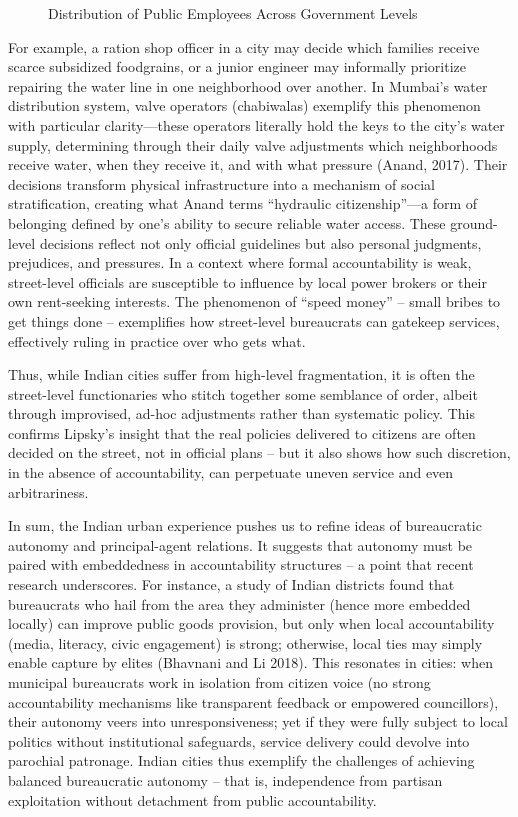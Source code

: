 \begin{figure}[htbp]
\centering
\caption{Distribution of Public Employees Across Government Levels}
\label{fig:employees_distribution}
\end{figure}

For example, a ration shop officer in a city may decide which families receive scarce subsidized foodgrains, or a junior engineer may informally prioritize repairing the water line in one neighborhood over another. In Mumbai's water distribution system, valve operators (chabiwalas) exemplify this phenomenon with particular clarity—these operators literally hold the keys to the city's water supply, determining through their daily valve adjustments which neighborhoods receive water, when they receive it, and with what pressure (Anand, 2017). Their decisions transform physical infrastructure into a mechanism of social stratification, creating what Anand terms ``hydraulic citizenship''—a form of belonging defined by one's ability to secure reliable water access. These ground-level decisions reflect not only official guidelines but also personal judgments, prejudices, and pressures. In a context where formal accountability is weak, street-level officials are susceptible to influence by local power brokers or their own rent-seeking interests. The phenomenon of ``speed money'' – small bribes to get things done – exemplifies how street-level bureaucrats can gatekeep services, effectively ruling in practice over who gets what.

Thus, while Indian cities suffer from high-level fragmentation, it is often the street-level functionaries who stitch together some semblance of order, albeit through improvised, ad-hoc adjustments rather than systematic policy. This confirms Lipsky's insight that the real policies delivered to citizens are often decided on the street, not in official plans – but it also shows how such discretion, in the absence of accountability, can perpetuate uneven service and even arbitrariness.

In sum, the Indian urban experience pushes us to refine ideas of bureaucratic autonomy and principal-agent relations. It suggests that autonomy must be paired with embeddedness in accountability structures – a point that recent research underscores. For instance, a study of Indian districts found that bureaucrats who hail from the area they administer (hence more embedded locally) can improve public goods provision, but only when local accountability (media, literacy, civic engagement) is strong; otherwise, local ties may simply enable capture by elites (Bhavnani and Li 2018). This resonates in cities: when municipal bureaucrats work in isolation from citizen voice (no strong accountability mechanisms like transparent feedback or empowered councillors), their autonomy veers into unresponsiveness; yet if they were fully subject to local politics without institutional safeguards, service delivery could devolve into parochial patronage. Indian cities thus exemplify the challenges of achieving balanced bureaucratic autonomy – that is, independence from partisan exploitation without detachment from public accountability.

